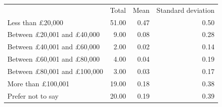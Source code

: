 \documentclass{article}
\begin{document}
\begin{table}[!h]
\centering
\begin{tabular}{llll}
\cline{1-4}
\multicolumn{1}{c}{} &
  \multicolumn{1}{|r}{Total} &
  \multicolumn{1}{r}{Mean} &
  \multicolumn{1}{r}{Standard deviation} \\
\cline{1-4}
\multicolumn{1}{l}{Less than £20,000} &
  \multicolumn{1}{|r}{51.00} &
  \multicolumn{1}{r}{0.47} &
  \multicolumn{1}{r}{0.50} \\
\multicolumn{1}{l}{Between £20,001 and £40,000} &
  \multicolumn{1}{|r}{9.00} &
  \multicolumn{1}{r}{0.08} &
  \multicolumn{1}{r}{0.28} \\
\multicolumn{1}{l}{Between £40,001 and £60,000} &
  \multicolumn{1}{|r}{2.00} &
  \multicolumn{1}{r}{0.02} &
  \multicolumn{1}{r}{0.14} \\
\multicolumn{1}{l}{Between £60,001 and £80,000} &
  \multicolumn{1}{|r}{4.00} &
  \multicolumn{1}{r}{0.04} &
  \multicolumn{1}{r}{0.19} \\
\multicolumn{1}{l}{Between £80,001 and £100,000} &
  \multicolumn{1}{|r}{3.00} &
  \multicolumn{1}{r}{0.03} &
  \multicolumn{1}{r}{0.17} \\
\multicolumn{1}{l}{More than £100,001} &
  \multicolumn{1}{|r}{19.00} &
  \multicolumn{1}{r}{0.18} &
  \multicolumn{1}{r}{0.38} \\
\multicolumn{1}{l}{Prefer not to say} &
  \multicolumn{1}{|r}{20.00} &
  \multicolumn{1}{r}{0.19} &
  \multicolumn{1}{r}{0.39} \\
\cline{1-4}
\end{tabular}
\end{table}
\end{document}

